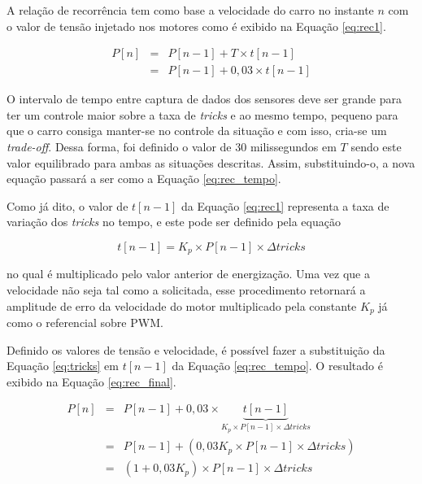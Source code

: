 	A relação de recorrência tem como base a velocidade do carro no instante $ n $ com o valor de tensão injetado nos motores como é exibido na Equação \ref{eq:rec1}. 

	\begin{eqnarray}
	P[n] & = & P[n-1] + T    \times t[n-1] \label{eq:rec1}\\
	~    & = & P[n-1] + 0,03 \times t[n-1] \label{eq:rec_tempo}
	\end{eqnarray}

	O intervalo de tempo entre captura de dados dos sensores deve ser grande para ter um controle maior sobre a taxa de \textit{tricks} e ao mesmo tempo, pequeno para que o carro consiga manter-se no controle da situação e com isso, cria-se um \textit{trade-off}. Dessa forma, foi definido o valor de $30$ milissegundos em $ T $ sendo este valor equilibrado para ambas as situações descritas. Assim, substituindo-o, a nova equação passará a ser como a Equação \ref{eq:rec_tempo}.

	Como já dito, o valor de $ t[n-1] $ da Equação \ref{eq:rec1} representa a taxa de variação dos \textit{tricks} no tempo, e este pode ser definido pela equação 

	\begin{equation}
		t[n-1] = K_p \times P[n-1] \times \Delta tricks \label{eq:tricks}
	\end{equation}

	no qual é multiplicado pelo valor anterior de energização. Uma vez que a velocidade não seja tal como a solicitada, esse procedimento retornará a amplitude de erro da velocidade do motor multiplicado pela constante $ K_p $ já como o referencial sobre PWM.

	Definido os valores de tensão e velocidade, é possível fazer a substituição da Equação \ref{eq:tricks} em $t[n-1]$ da Equação \ref{eq:rec_tempo}. O resultado é exibido na Equação \ref{eq:rec_final}.

	\begin{eqnarray}
	P[n] & = & P[n-1] + 0,03 \times \underbrace{t[n-1]}_{K_p \times P[n-1] \times \Delta tricks}\\
	~    & = & P[n-1] + (0,03 K_p \times P[n-1] \times \Delta tricks)    \nonumber \\
	~    & = & (1 + 0,03 K_p) \times P[n-1] \times \Delta tricks   \label{eq:rec_final}
	\end{eqnarray}

